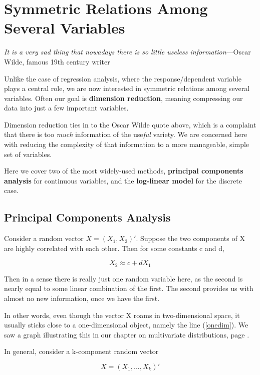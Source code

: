 \section{Symmetric Relations Among Several Variables}

{\it It is a very sad thing that nowadays there is so little useless
information}---Oscar Wilde, famous 19th century writer

Unlike the case of regression analysis, where the response/dependent
variable plays a central role, we are now interested in symmetric
relations among several variables.  Often our goal is {\bf dimension
reduction}, meaning compressing our data into just a few important
variables.

Dimension reduction ties in to the Oscar Wilde quote above, which is a
complaint that there is too {\it much} information of the use{\it ful}
variety.  We are concerned here with reducing the complexity of that
information to a more manageable, simple set of variables.

Here we cover two of the most widely-used methods, {\bf principal
components analysis} for continuous variables, and the {\bf log-linear model}
for the discrete case.

\subsection{Principal Components Analysis}
\label{pca}

Consider a random vector $X = (X_1,X_2)'$.  Suppose the two
components of X are highly correlated with each other.  
Then for some constants c and d,

\begin{equation}
\label{onedim}
X_2 \approx c + d X_1
\end{equation}

Then in a sense there is really just one random variable here, as the
second is nearly equal to some linear combination of the first.  The
second provides us with almost no new information, once we have the
first.

In other words, even though the vector X roams in two-dimensional space,
it usually sticks close to a one-dimensional object, namely the line
(\ref{onedim}).  We saw a graph illustrating this in our chapter on
multivariate distributions, page \pageref{rho2}.

In general, consider a k-component random vector 

\begin{equation}
X = (X_1,...,X_k)'
\end{equation}

